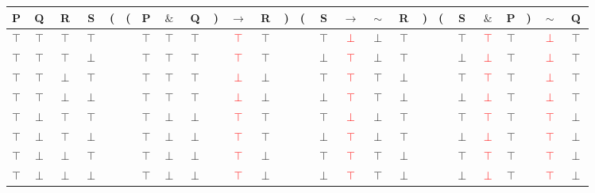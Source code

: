 \documentclass[12pt]{article}
\begin{document}
	\begin{tabular}{ c  c  c  c | c  c  c  c  c  c  c  c  c | c  c  c  c  c  c | c  c  c  c  c | c  c }
		
		P & Q & R & S & ( & ( & P & $\&$ & Q & ) & $\rightarrow$ & R & ) & ( & S & $\rightarrow$ & $\sim$ & R & ) & ( & S & $\&$ & P & ) & $\sim$ & Q\\
		\hline 
		$\top$ & $\top$ & $\top$ & $\top$ &  &  & $\top$ & $\top$ & $\top$ &  & \textcolor{red}{$\top$} & $\top$ &  &  & $\top$ & \textcolor{red}{$\perp$} & $\perp$ & $\top$ &  &  & $\top$ & \textcolor{red}{$\top$} & $\top$ &  & \textcolor{red}{$\perp$} & $\top$\\
		$\top$ & $\top$ & $\top$ & $\perp$ &  &  & $\top$ & $\top$ & $\top$ &  & \textcolor{red}{$\top$} & $\top$ &  &  & $\perp$ & \textcolor{red}{$\top$} & $\perp$ & $\top$ &  &  & $\perp$ & \textcolor{red}{$\perp$} & $\top$ &  & \textcolor{red}{$\perp$} & $\top$\\
		$\top$ & $\top$ & $\perp$ & $\top$ &  &  & $\top$ & $\top$ & $\top$ &  & \textcolor{red}{$\perp$} & $\perp$ &  &  & $\top$ & \textcolor{red}{$\top$} & $\top$ & $\perp$ &  &  & $\top$ & \textcolor{red}{$\top$} & $\top$ &  & \textcolor{red}{$\perp$} & $\top$\\
		$\top$ & $\top$ & $\perp$ & $\perp$ &  &  & $\top$ & $\top$ & $\top$ &  & \textcolor{red}{$\perp$} & $\perp$ &  &  & $\perp$ & \textcolor{red}{$\top$} & $\top$ & $\perp$ &  &  & $\perp$ & \textcolor{red}{$\perp$} & $\top$ &  & \textcolor{red}{$\perp$} & $\top$\\
		$\top$ & $\perp$ & $\top$ & $\top$ &  &  & $\top$ & $\perp$ & $\perp$ &  & \textcolor{red}{$\top$} & $\top$ &  &  & $\top$ & \textcolor{red}{$\perp$} & $\perp$ & $\top$ &  &  & $\top$ & \textcolor{red}{$\top$} & $\top$ &  & \textcolor{red}{$\top$} & $\perp$\\
		$\top$ & $\perp$ & $\top$ & $\perp$ &  &  & $\top$ & $\perp$ & $\perp$ &  & \textcolor{red}{$\top$} & $\top$ &  &  & $\perp$ & \textcolor{red}{$\top$} & $\perp$ & $\top$ &  &  & $\perp$ & \textcolor{red}{$\perp$} & $\top$ &  & \textcolor{red}{$\top$} & $\perp$\\
		$\top$ & $\perp$ & $\perp$ & $\top$ &  &  & $\top$ & $\perp$ & $\perp$ &  & \textcolor{red}{$\top$} & $\perp$ &  &  & $\top$ & \textcolor{red}{$\top$} & $\top$ & $\perp$ &  &  & $\top$ & \textcolor{red}{$\top$} & $\top$ &  & \textcolor{red}{$\top$} & $\perp$\\
		$\top$ & $\perp$ & $\perp$ & $\perp$ &  &  & $\top$ & $\perp$ & $\perp$ &  & \textcolor{red}{$\top$} & $\perp$ &  &  & $\perp$ & \textcolor{red}{$\top$} & $\top$ & $\perp$ &  &  & $\perp$ & \textcolor{red}{$\perp$} & $\top$ &  & \textcolor{red}{$\top$} & $\perp$\\

\end{tabular}
\end{document}
